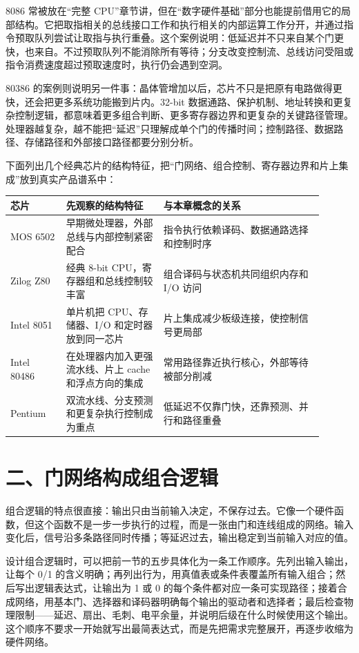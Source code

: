 \begin{chipcase}
8086 常被放在“完整 CPU”章节讲，但在“数字硬件基础”部分也能提前借用它的局部结构。它把取指相关的总线接口工作和执行相关的内部运算工作分开，并通过指令预取队列尝试让取指与执行重叠。这个案例说明：低延迟并不只来自某个门更快，也来自。不过预取队列不能消除所有等待；分支改变控制流、总线访问受阻或指令消费速度超过预取速度时，执行仍会遇到空洞。
\end{chipcase}

80386 的案例则说明另一件事：晶体管增加以后，芯片不只是把原有电路做得更快，还会把更多系统功能搬到片内。32-bit 数据通路、保护机制、地址转换和更复杂控制逻辑，都意味着更多组合判断、更多寄存器边界和更复杂的关键路径管理。处理器越复杂，越不能把“延迟”只理解成单个门的传播时间；控制路径、数据路径、存储路径和外部接口路径都要分别分析。

下面列出几个经典芯片的结构特征，把“门网络、组合控制、寄存器边界和片上集成”放到真实产品谱系中：

\begin{longtable}{L{0.16\linewidth}L{0.28\linewidth}L{0.46\linewidth}}
\toprule
芯片 & 先观察的结构特征 & 与本章概念的关系 \\
\midrule
MOS 6502 & 早期微处理器，外部总线与内部控制紧密配合 & 指令执行依赖译码、数据通路选择和控制时序 \\\tablerowrule
Zilog Z80 & 经典 8-bit CPU，寄存器组和总线控制较丰富 & 组合译码与状态机共同组织内存和 I/O 访问 \\\tablerowrule
Intel 8051 & 单片机把 CPU、存储器、I/O 和定时器放到同一芯片 & 片上集成减少板级连接，使控制信号更局部 \\\tablerowrule
Intel 80486 & 在处理器内加入更强流水线、片上 cache 和浮点方向的集成 & 常用路径靠近执行核心，外部等待被部分削减 \\\tablerowrule
Pentium & 双流水线、分支预测和更复杂执行控制成为重点 & 低延迟不仅靠门快，还靠预测、并行和路径重叠 \\
\bottomrule
\end{longtable}

\section{二、门网络构成组合逻辑}

组合逻辑的特点很直接：输出只由当前输入决定，不保存过去。它像一个硬件函数，但这个函数不是一步一步执行的过程，而是一张由门和连线组成的网络。输入变化后，信号沿多条路径同时传播；等延迟过去，输出稳定到当前输入对应的值。

设计组合逻辑时，可以把前一节的五步具体化为一条工作顺序。先列出输入输出，让每个 0/1 的含义明确；再列出行为，用真值表或条件表覆盖所有输入组合；然后写出逻辑表达式，让输出为 1 或 0 的每个条件都对应一条可实现路径；接着合成网络，用基本门、选择器和译码器明确每个输出的驱动者和选择者；最后检查物理限制——延迟、扇出、毛刺、电平余量，并说明后级在什么时候使用这个输出。这个顺序不要求一开始就写出最简表达式，而是先把需求完整展开，再逐步收缩为硬件网络。

